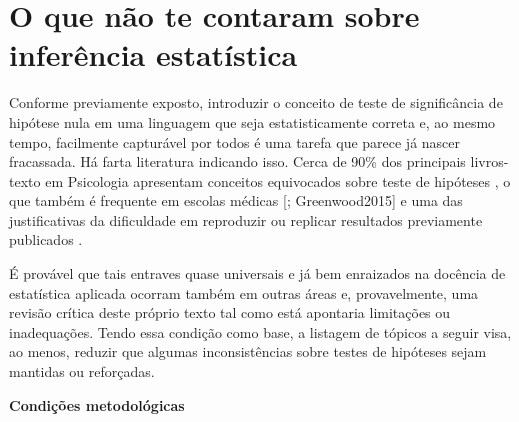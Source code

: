 \documentclass[
]{book}
\begin{document}
\hypertarget{o-que-nuxe3o-te-contaram-sobre-inferuxeancia-estatuxedstica}{%
\section{O que não te contaram sobre inferência estatística}\label{o-que-nuxe3o-te-contaram-sobre-inferuxeancia-estatuxedstica}}

Conforme previamente exposto, introduzir o conceito de teste de significância de hipótese nula em uma linguagem que seja estatisticamente correta e, ao mesmo tempo, facilmente capturável por todos é uma tarefa que parece já nascer fracassada. Há farta literatura indicando isso. Cerca de 90\% dos principais livros-texto em Psicologia apresentam conceitos equivocados sobre teste de hipóteses \citep{Cassidy2019}, o que também é frequente em escolas médicas {[}\citet{OcaaRiola2016}; Greenwood2015{]} e uma das justificativas da dificuldade em reproduzir ou replicar resultados previamente publicados \citep{Motulsky2014}.

É provável que tais entraves quase universais e já bem enraizados na docência de estatística aplicada ocorram também em outras áreas e, provavelmente, uma revisão crítica deste próprio texto tal como está apontaria limitações ou inadequações. Tendo essa condição como base, a listagem de tópicos a seguir visa, ao menos, reduzir que algumas inconsistências sobre testes de hipóteses sejam mantidas ou reforçadas.

\textbf{Condições metodológicas}
\end{document}
